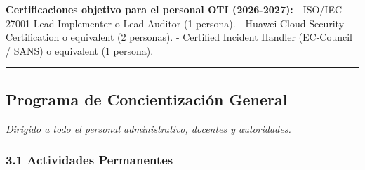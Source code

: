 \documentclass[10pt,letterpaper]{article}
\begin{document}
\textbf{Certificaciones objetivo para el personal OTI (2026-2027):} -
ISO/IEC 27001 Lead Implementer o Lead Auditor (1 persona). - Huawei
Cloud Security Certification o equivalent (2 personas). - Certified
Incident Handler (EC-Council / SANS) o equivalent (1 persona).

\begin{center}\rule{0.5\linewidth}{0.5pt}\end{center}

\subsection{Programa de Concientización
General}\label{programa-de-concientizaciuxf3n-general}

\emph{Dirigido a todo el personal administrativo, docentes y
autoridades.}

\subsubsection{3.1 Actividades
Permanentes}\label{actividades-permanentes}
\end{document}
